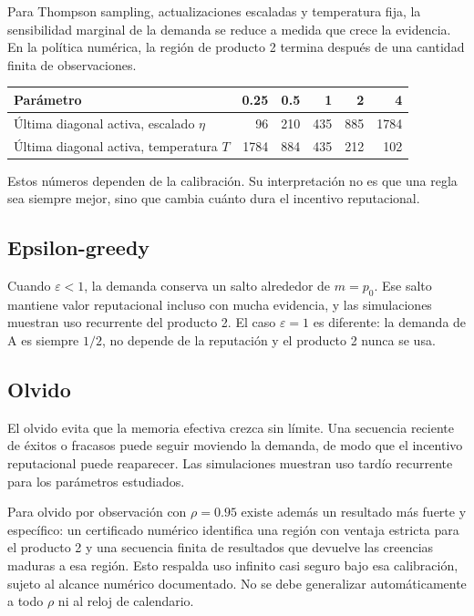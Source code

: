 \documentclass[11pt]{article}
\begin{document}
Para Thompson sampling, actualizaciones escaladas y temperatura fija, la
sensibilidad marginal de la demanda se reduce a medida que crece la evidencia.
En la política numérica, la región de producto 2 termina después de una
cantidad finita de observaciones.

\begin{center}
\begin{tabular}{lrrrrr}
\toprule
Parámetro & 0.25 & 0.5 & 1 & 2 & 4 \\
\midrule
Última diagonal activa, escalado $\eta$ & 96 & 210 & 435 & 885 & 1784 \\
Última diagonal activa, temperatura $T$ & 1784 & 884 & 435 & 212 & 102 \\
\bottomrule
\end{tabular}
\end{center}

Estos números dependen de la calibración. Su interpretación no es que una
regla sea siempre mejor, sino que cambia cuánto dura el incentivo
reputacional.

\subsection{Epsilon-greedy}

Cuando $\varepsilon<1$, la demanda conserva un salto alrededor de $m=p_0$.
Ese salto mantiene valor reputacional incluso con mucha evidencia, y las
simulaciones muestran uso recurrente del producto 2. El caso
$\varepsilon=1$ es diferente: la demanda de A es siempre $1/2$, no depende de
la reputación y el producto 2 nunca se usa.

\subsection{Olvido}

El olvido evita que la memoria efectiva crezca sin límite. Una secuencia
reciente de éxitos o fracasos puede seguir moviendo la demanda, de modo que el
incentivo reputacional puede reaparecer. Las simulaciones muestran uso tardío
recurrente para los parámetros estudiados.

Para olvido por observación con $\rho=0.95$ existe además un resultado más
fuerte y específico: un certificado numérico identifica una región con ventaja
estricta para el producto 2 y una secuencia finita de resultados que devuelve
las creencias maduras a esa región. Esto respalda uso infinito casi seguro
bajo esa calibración, sujeto al alcance numérico documentado. No se debe
generalizar automáticamente a todo $\rho$ ni al reloj de calendario.
\end{document}

